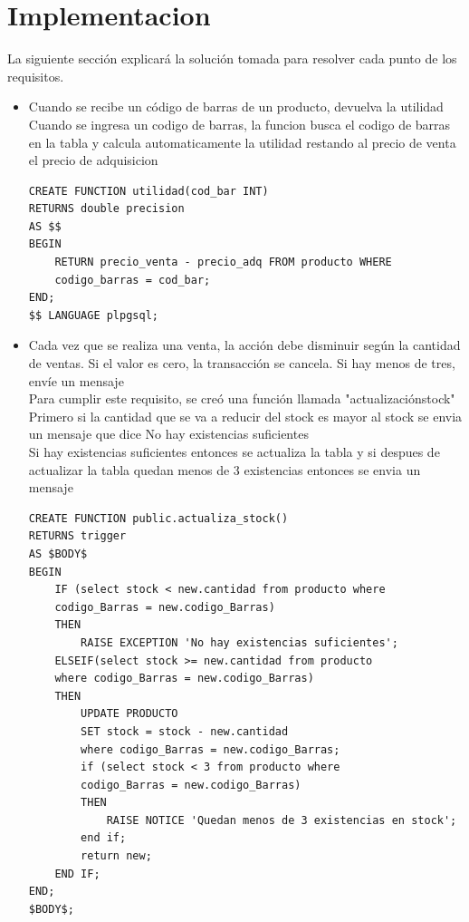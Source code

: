 \documentclass{article}
\begin{document}
\section{Implementacion}
La siguiente sección explicará la solución tomada para resolver cada punto de los requisitos.\\

\begin{itemize}
\item Cuando se recibe un código de barras de un producto, devuelva la utilidad \\

Cuando se ingresa un codigo de barras, la funcion busca el codigo de barras en la tabla y calcula automaticamente la utilidad restando al precio de venta el precio de adquisicion\\

\begin{lstlisting}
CREATE FUNCTION utilidad(cod_bar INT)
RETURNS double precision
AS $$
BEGIN
	RETURN precio_venta - precio_adq FROM producto WHERE 
	codigo_barras = cod_bar;
END;
$$ LANGUAGE plpgsql;
\end{lstlisting}

\item Cada vez que se realiza una venta, la acción debe disminuir según la cantidad de ventas. Si el valor es cero, la transacción se cancela. Si hay menos de tres, envíe un mensaje \\

Para cumplir este requisito, se creó una función llamada "actualización\textunderscore stock"\\

Primero si la cantidad que se va a reducir del stock es mayor al stock se envia un mensaje que dice No hay existencias suficientes\\

Si hay existencias suficientes entonces se actualiza la tabla y si despues de actualizar la tabla quedan menos de 3 existencias entonces se envia un mensaje\\

\begin{lstlisting}
CREATE FUNCTION public.actualiza_stock()
RETURNS trigger
AS $BODY$
BEGIN
	IF (select stock < new.cantidad from producto where 
	codigo_Barras = new.codigo_Barras) 
	THEN 
		RAISE EXCEPTION 'No hay existencias suficientes';
	ELSEIF(select stock >= new.cantidad from producto 
	where codigo_Barras = new.codigo_Barras)
	THEN
		UPDATE PRODUCTO
		SET stock = stock - new.cantidad 
		where codigo_Barras = new.codigo_Barras;
		if (select stock < 3 from producto where 
		codigo_Barras = new.codigo_Barras)
		THEN
			RAISE NOTICE 'Quedan menos de 3 existencias en stock';
		end if;
		return new;
	END IF;
END;
$BODY$;
\end{lstlisting}


\end{itemize}
\end{document}
